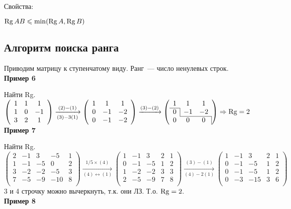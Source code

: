 Свойства:

$\operatorname{\mathop{Rg}} AB \leqslant \min(\operatorname{\mathop{Rg}} A, \operatorname{\mathop{Rg}} B)$

\subsection{Алгоритм поиска ранга}
Приводим матрицу к ступенчатому виду. Ранг~--- число ненулевых строк.\\
\textbf{Пример 6}

Найти Rg.\vspace{3mm}\\
$
\left( \begin{array}{ccc}
	1 & 1 & 1\\
	1 & 0 & -1\\
	3 & 2 & 1\\
\end{array} \right)
\xrightarrow[(3)-3(1)]{(2)-(1)}
\left( \begin{array}{ccc}
1 & 1 & 1\\
0 & -1 & -2\\
0 & -1 & -2\\
\end{array} \right)
\xrightarrow{(3)-(2)}
\left( \begin{array}{ccc}
1 & 1 & 1\\ \cline{1-1}
0 & \multicolumn{1}{|c}{-1} & -2\\ \cline{2-3}
0 & 0 & \multicolumn{1}{c|}{0}\\
\end{array} \right) \Rightarrow \Rg =2
$\vspace{3mm}\\
\textbf{Пример 7}

Найти Rg.\vspace{3mm}\\
$
\left( \begin{array}{ccccc}
2 & -1 & 3 & -5 & 1\\
1 & -1 & -5 & 0 & 2\\
3 & -2 & -2 & -5 & 3\\
7 & -5 & -9 & -10 & 8\\
\end{array} \right)
\xrightarrow[(4)\leftrightarrow(1)]{1/5\times(4)}
\left( \begin{array}{ccccc}
1 & -1 & 3 & 2 & 1\\
0 & -1 & -5 & 1 & 2\\
1 & -2 & -2 & 3 & 3\\
2 & -5 & -9 & 7 & 8\\
\end{array} \right)
\xrightarrow[(4)-2(1)]{(3)-(1)}
\left( \begin{array}{ccccc}
1 & -1 & 3 & 2 & 1\\
0 & -1 & -5 & 1 & 2\\
0 & -1 & -5 & 1 & 2\\
0 & -3 & -15 & 3 & 6\\
\end{array} \right)
$\vspace{3mm}\\
3 и 4 строчку можно вычеркнуть, т.к. они ЛЗ. Т.о. $\operatorname{\mathop{Rg}}=2$.\\
\textbf{Пример 8}

